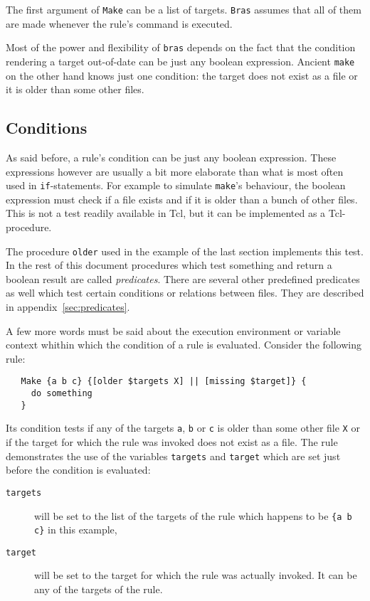 \documentclass[11pt,bibtotoc,idxtotoc]{scrreprt}
\newcommand{\bras}{\texttt{bras}}
\newcommand{\Bras}{\texttt{Bras}}
\newcommand{\make}{\texttt{make}}
\begin{document}
The first argument of \texttt{Make} can be a list of targets.
\Bras{} assumes that all of them are made whenever the rule's command
is executed.

Most of the power and flexibility of \bras{} depends on the fact that
the condition rendering a target out-of-date can be just any
boolean expression. Ancient \make{} on the other hand knows just one
condition: the target does not exist as a file or it is older than
some other files.


\subsection{Conditions}

As said before, a rule's condition can be just any boolean expression.
These expressions however are usually a bit more elaborate than what
is most often used in \texttt{if}-statements. For example to simulate
\make's behaviour, the boolean expression must check if a file exists
and if it is older than a bunch of other files. This is not a test
readily available in Tcl, but it can be implemented as a
Tcl-procedure.

The procedure \texttt{older} used in the example of the last section
implements this test. In the rest of this document procedures which
test something and return a boolean result are called
\textit{predicates}. There are several other
predefined predicates as well which test certain conditions or
relations between files. They are described in
appendix~\ref{sec:predicates}.

A few more words must be said about the execution environment or
variable context whithin which the condition of a rule is evaluated.
Consider the following rule:
\begin{verbatim}
   Make {a b c} {[older $targets X] || [missing $target]} {
     do something
   }
\end{verbatim}
Its condition tests if any of the targets \texttt{a}, \texttt{b} or
\texttt{c} is older than some other file \texttt{X} or if the target
for which the rule was invoked does not exist as a file. The rule
demonstrates the use of the variables \texttt{targets} and
\texttt{target} which are set just before the condition is evaluated:
\begin{description}
\item[\texttt{targets}] will be set
to the list of the targets of the rule which happens to be \texttt{\{a
  b c\}} in this example,
\item[\texttt{target}] will be set to the target for which the rule
  was actually invoked. It can be any of the targets of the rule.
\end{description}
\end{document}
